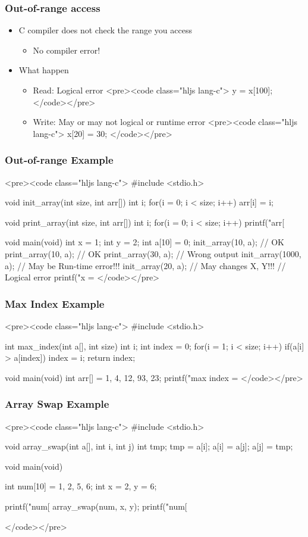 \documentclass{../c-lecture}
\begin{document}
\begin{frame}
  \frametitle{Out-of-range access}
  \begin{itemize}
    \item C compiler does not check the range you access
    \begin{itemize}
      <pre><code class="hljs lang-c">
int x[10]; x[20] = 30; y = x[100];
      </code></pre>
      \item No compiler error!
    \end{itemize}
    \item What happen
    \begin{itemize}
      \item Read: Logical error
      <pre><code class="hljs lang-c">
y = x[100];
      </code></pre>
      \item Write: May or may not logical or runtime error
      <pre><code class="hljs lang-c">
x[20] = 30;
      </code></pre>
    \end{itemize}
  \end{itemize}
\end{frame}
\begin{frame}
  \frametitle{Out-of-range Example}
  <pre><code class="hljs lang-c">
#include <stdio.h>

void init_array(int size, int arr[]){
  int i;
  for(i = 0; i < size; i++)
    arr[i] = i;
}

void print_array(int size, int arr[]){
  int i;
  for(i = 0; i < size; i++)
    printf("arr[%
}

void main(void){
  int x = 1;
  int y = 2;
  int a[10] = {0};
  init_array(10, a);   // OK
  print_array(10, a);  // OK
  print_array(30, a);  // Wrong output
  init_array(1000, a); // May be Run-time error!!!
  init_array(20, a);   // May changes X, Y!!!
                       // Logical error
  printf("x = %
}
  </code></pre>
\end{frame}
\begin{frame}
  \frametitle{Max Index Example}
  <pre><code class="hljs lang-c">
#include <stdio.h>

int max_index(int a[], int size){
  int i;
  int index = 0;
  for(i = 1; i < size; i++)
    if(a[i] > a[index])
      index = i;
  return index;
}

void main(void){
  int arr[] = {1, 4, 12, 93, 23};
  printf("max index = %
}
  </code></pre>
\end{frame}
\begin{frame}
  \frametitle{Array Swap Example}
  <pre><code class="hljs lang-c">
#include <stdio.h>

void array_swap(int a[], int i, int j){
  int tmp;
  tmp = a[i];
  a[i] = a[j];
  a[j] = tmp;
}

void main(void){
  int num[10] = {1, 2, 5, 6};
  int x = 2, y = 6;

  printf("num[%
  array_swap(num, x, y);
  printf("num[%
}
  </code></pre>
\end{frame}
\end{document}
